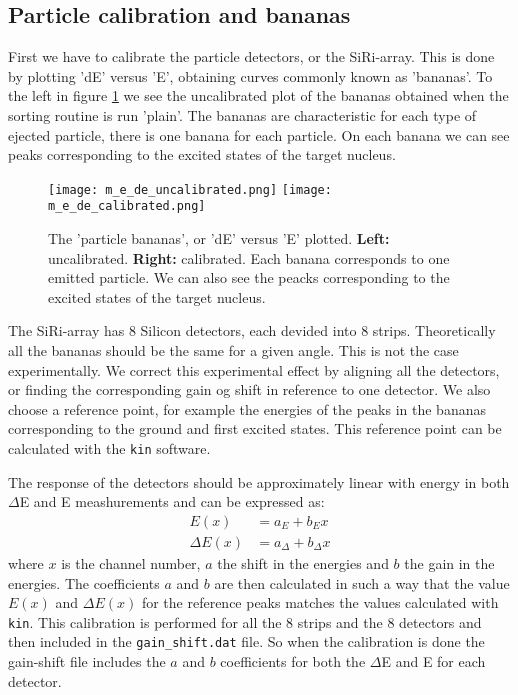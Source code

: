 \documentclass[11pt,a4wide]{article}
\begin{document}
\subsection{Particle calibration and bananas} \label{sec: particle_calib}
First we have to calibrate the particle detectors, or the SiRi-array. This is done by plotting 'dE' versus 'E', obtaining curves commonly known as 'bananas'. To the left in figure \ref{fig: de_e} we see the uncalibrated plot of the bananas obtained when the sorting routine is run 'plain'. The bananas are characteristic for each type of ejected particle, there is one banana for each particle. On each banana we can see peaks corresponding to the excited states of the target nucleus. 

\begin{figure}[htp]
\centering
\texttt{[image: m\_e\_de\_uncalibrated.png]}
\texttt{[image: m\_e\_de\_calibrated.png]} 
\caption{The 'particle bananas', or 'dE' versus 'E' plotted. \textbf{Left:} uncalibrated. \textbf{Right:} calibrated. Each banana corresponds to one emitted particle. We can also see the peacks corresponding to the excited states of the target nucleus.}
\label{fig: de_e}
\end{figure}

The SiRi-array has 8 Silicon detectors, each devided into 8 strips. Theoretically all the bananas should be the same for a given angle. This is not the case experimentally. We correct this experimental effect by aligning all the detectors, or finding the corresponding gain og shift in reference to one detector. We also choose a reference point, for example the energies of the peaks in the bananas corresponding to the ground and first excited states. This reference point can be calculated with the \texttt{kin} software. 

The response of the detectors should be approximately linear with energy in both $\Delta$E and E meashurements and can be expressed as:
\begin{align*}
E(x) &= a_E + b_Ex\\
\Delta E(x) &= a_\Delta + b_\Delta x
\end{align*}
where $x$ is the channel number, $a$ the shift in the energies and $b$ the gain in the energies. The coefficients $a$ and $b$ are then calculated in such a way that the value $E(x)$ and $\Delta E(x)$ for the reference peaks matches the values calculated with \texttt{kin}. This calibration is performed for all the 8 strips and the 8 detectors and then included in the \texttt{gain\_shift.dat} file. So when the calibration is done the gain-shift file includes the $a$ and $b$ coefficients for both the $\Delta$E and E for each detector.
\end{document}
